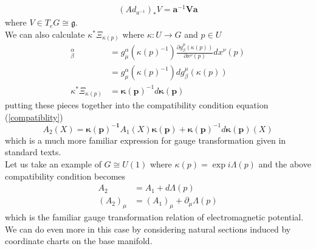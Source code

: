\documentclass[12pt]{article}
\newcommand{\matr}[1]{\mathbf{#1}}
\begin{document}
\begin{align*}
    (Ad_{a^{-1}})_{\ast}V = \matr{a}^{-1}\matr{V}\matr{a}
\end{align*} where $V \in T_{e}G \cong \mathfrak{g}$. \\
We can also calculate $\kappa^{\ast}\Xi_{\kappa(p)}$ where $\kappa \colon U \to G$ and $p \in U$
\begin{align*}
    [\kappa^{\ast}\Xi_{\kappa(p)}]^{\alpha}_{\beta} &= g^{\alpha}_{\mu}(\kappa(p)^{-1})\frac{\partial g^{\mu}_{\beta}(\kappa(p))}{\partial x^{\nu}(p)}dx^{\nu}(p) \\
                                                    &= g^{\alpha}_{\mu}(\kappa(p)^{-1})dg^{\mu}_{\beta}(\kappa(p)) \\
                       \kappa^{\ast}\Xi_{\kappa(p)} &= \boldsymbol{\kappa(p)}^{-1}d\boldsymbol{\kappa(p)}
\end{align*} putting these pieces together into the compatibility condition equation (\ref{compatiblity})
\begin{equation}
    A_{2}(X) = \boldsymbol{\kappa(p)^{-1}}A_{1}(X)\boldsymbol{\kappa(p)} + \boldsymbol{\kappa(p)}^{-1}d\boldsymbol{\kappa(p)}(X)
\end{equation} which is a much more familiar expression for gauge transformation given in standard texts. \\
Let us take an example of $G \cong U(1)$ where $\kappa(p) = \exp{i\Lambda(p)}$ and the above compatibility condition becomes
\begin{align*}
    A_{2} &= A_{1} + d\Lambda(p) \\
    (A_{2})_{\mu} &= (A_{1})_{\mu} + \partial_{\mu}\Lambda(p)
\end{align*} which is the familiar gauge transformation relation of electromagnetic potential. \\
We can do even more in this case by considering natural sections induced by coordinate charts on the base manifold. 
\end{document}
